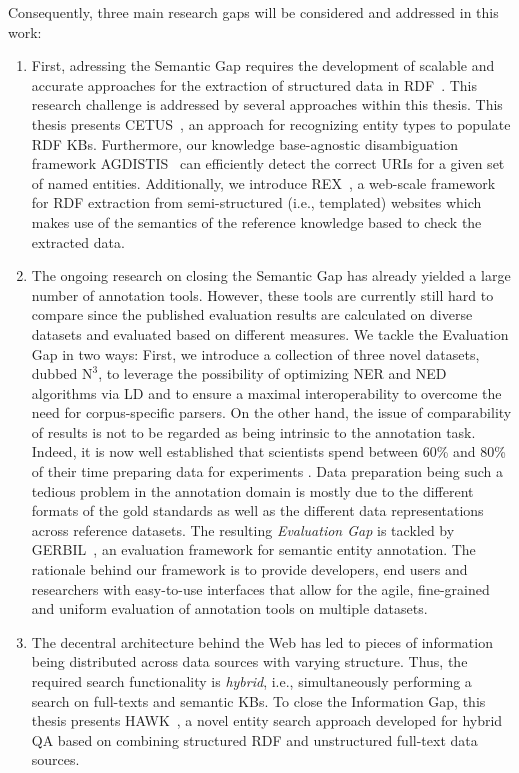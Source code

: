 Consequently, three main research gaps will be considered and addressed in this work:
\begin{enumerate}
\item 
First, adressing the Semantic Gap requires the development of scalable and accurate approaches for the extraction of structured data in \ac{RDF}~\cite{rdfprimer}.
This research challenge is addressed by several approaches within this thesis.
This thesis presents CETUS~\cite{CETUS_2015}, an approach for recognizing entity types to populate \ac{RDF} \ac{KB}s. 
Furthermore, our knowledge base-agnostic disambiguation framework AGDISTIS~\cite{agdistis_iswc} can efficiently detect the correct URIs for a given set of named entities.
Additionally, we introduce REX~\cite{rex}, a web-scale framework for \ac{RDF} extraction from semi-structured (i.e., templated) websites which makes use of the semantics of the reference knowledge based to check the extracted data.
\item 
The ongoing research on closing the Semantic Gap has already yielded a large number of annotation tools.
However, these tools are currently still hard to compare since the published evaluation results are calculated on diverse datasets and evaluated based on different measures.
We tackle the Evaluation Gap in two ways: First, we introduce a collection of three novel datasets, dubbed $\mbox{N}^3$, to leverage the possibility of optimizing NER and NED algorithms via \ac{LD} and to ensure a maximal interoperability to overcome the need for corpus-specific parsers. 
On the other hand, the issue of  comparability of results is not to be regarded as being intrinsic to the annotation task. 
Indeed, it is now well established that scientists spend between 60\% and 80\% of their time preparing data for experiments \cite{GIL2014,jermyn1999preparing,peng2011reproducible}. 
Data preparation being such a tedious problem in the annotation domain is mostly due to the different formats of the gold standards as well as the different data representations across reference datasets.
The resulting \emph{Evaluation Gap} is tackled by GERBIL~\cite{GERBIL}, an evaluation framework for semantic entity annotation. 
The rationale behind our framework is to provide developers, end users and researchers with easy-to-use interfaces that allow for the agile, fine-grained and uniform evaluation of annotation tools on multiple datasets.
\item 
The decentral architecture behind the Web has led to pieces of information being distributed across data sources with varying structure. 
Thus, the required search functionality is \emph{hybrid}, i.e., simultaneously performing a search on full-texts and semantic \ac{KB}s.
To close the {Information Gap}, this thesis presents HAWK~\cite{hawk_2015}, a novel entity search approach developed for hybrid \ac{QA} based on combining structured \ac{RDF} and unstructured full-text data sources.
\end{enumerate}

